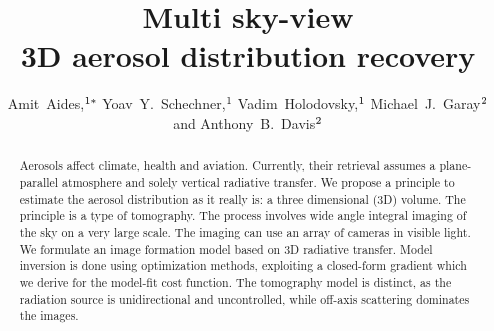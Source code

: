 \documentclass[10pt,letterpaper]{article}
\newcommand\authnote[1]{\textsuperscript{\normalfont#1}}
\newcommand\affilnote[1]{\textsuperscript{\normalfont#1}}
\providecommand\textsuperscript[1]{$^{#1}$}
\begin{document}


\title{Multi sky-view\\ 3D aerosol distribution recovery}

\author{Amit~Aides,\authnote{1*} Yoav~Y.~Schechner,\authnote{1}
  Vadim~Holodovsky,\authnote{1} Michael~J.~Garay\authnote{2} and Anthony~B.~Davis\authnote{2}}

\address{\affilnote{1}Electrical Engineering Department, Technion - Israel Institute of Technology, Haifa 32000, Israel\\
  \affilnote{2}Jet Propulsion Laboratory, California Institute of
  Technology, Pasadena, CA 91109, USA}

\email{\authnote{*}amitibo@tx.technion.ac.il} %




\begin{abstract}
  Aerosols affect climate, health and aviation.  Currently, their
  retrieval assumes a plane-parallel atmosphere and solely vertical
  radiative transfer. We propose a principle to estimate the
  aerosol distribution as it really is: a three dimensional (3D)
  volume.  The principle is a type of
  tomography. The process involves wide angle integral imaging of the
  sky on a very large scale. The imaging can use an array of cameras in visible light.
  We formulate an image formation model
  based on 3D radiative transfer. Model inversion is done using optimization methods,
  exploiting a closed-form gradient which we derive for the model-fit
  cost function.  The tomography model is distinct, as the radiation
  source is unidirectional and uncontrolled, while off-axis scattering
  dominates the images.
\end{abstract}

\end{document}
